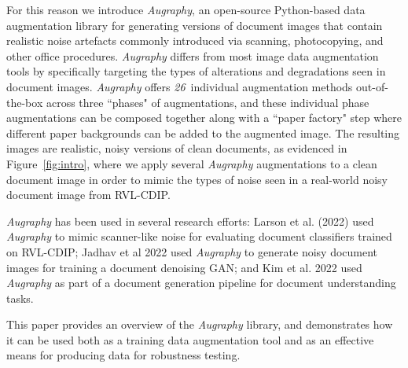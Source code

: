 \documentclass[runningheads]{llncs}
\newcommand{\numAugraphyAugmentations}{\emph{26}}
\begin{document}
For this reason we introduce \emph{Augraphy}, an open-source Python-based data augmentation library for generating versions of document images that contain realistic noise artefacts commonly introduced via scanning, photocopying, and other office procedures.
\emph{Augraphy} differs from most image data augmentation tools by specifically targeting the types of alterations and degradations seen in document images.
\emph{Augraphy} offers \numAugraphyAugmentations ~individual augmentation methods out-of-the-box across three ``phases" of augmentations, and these individual phase augmentations can be composed together along with a ``paper factory" step where different paper backgrounds can be added to the augmented image.
The resulting images are realistic, noisy versions of clean documents, as evidenced in Figure~\ref{fig:intro}, where we apply several \emph{Augraphy} augmentations to a clean document image in order to mimic the types of noise seen in a real-world noisy document image from RVL-CDIP.

\emph{Augraphy} has been used in several research efforts: Larson et al. (2022) \cite{larson-2022-rvlcdip-ood} used \emph{Augraphy} to mimic scanner-like noise for evaluating document classifiers trained on RVL-CDIP; Jadhav et al 2022 \cite{jadhav2022pix2pix} used \emph{Augraphy} to generate noisy document images for training a document denoising GAN; and Kim et al. 2022 \cite{webvicob-2022-naver} used \emph{Augraphy} as part of a document generation pipeline for document understanding tasks.

This paper provides an overview of the \emph{Augraphy} library, and demonstrates how it can be used both as a training data augmentation tool and as an effective means for producing data for robustness testing.
\end{document}
